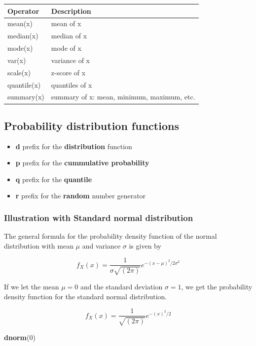 \documentclass[
]{book}
\newenvironment{Shaded}{\begin{snugshade}}{\end{snugshade}}
\newcommand{\DecValTok}[1]{\textcolor[rgb]{0.00,0.00,0.81}{#1}}
\newcommand{\KeywordTok}[1]{\textcolor[rgb]{0.13,0.29,0.53}{\textbf{#1}}}
\newcommand{\NormalTok}[1]{#1}
\begin{document}
\begin{longtable}[]{@{}ll@{}}
\toprule
Operator & Description\tabularnewline
\midrule
\endhead
mean(x) & mean of x\tabularnewline
median(x) & median of x\tabularnewline
mode(x) & mode of x\tabularnewline
var(x) & variance of x\tabularnewline
scale(x) & z-score of x\tabularnewline
quantile(x) & quantiles of x\tabularnewline
summary(x) & summary of x: mean, minimum, maximum, etc.\tabularnewline
\bottomrule
\end{longtable}

\hypertarget{probability-distribution-functions}{%
\subsection{Probability distribution functions}\label{probability-distribution-functions}}

\begin{itemize}
\item
  \textbf{d} prefix for the \textbf{distribution} function
\item
  \textbf{p} prefix for the \textbf{cummulative probability}
\item
  \textbf{q} prefix for the \textbf{quantile}
\item
  \textbf{r} prefix for the \textbf{random} number generator
\end{itemize}

\hypertarget{illustration-with-standard-normal-distribution}{%
\subsubsection{Illustration with Standard normal distribution}\label{illustration-with-standard-normal-distribution}}

The general formula for the probability density function of the normal distribution with mean \(\mu\) and variance \(\sigma\) is given by

\[
f_X(x) = \frac{1}{\sigma\sqrt{(2\pi)}} e^{-(x-\mu)^2/2\sigma^2}
\]

If we let the mean \(\mu=0\) and the standard deviation \(\sigma=1\), we get the probability density function for the standard normal distribution.

\[
f_X(x) = \frac{1}{\sqrt{(2\pi)}} e^{-(x)^2/2}
\]

\begin{Shaded}
\begin{Highlighting}[]
\KeywordTok{dnorm}\NormalTok{(}\DecValTok{0}\NormalTok{)}
\end{Highlighting}
\end{Shaded}
\end{document}
